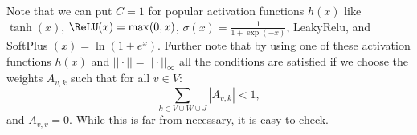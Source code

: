 \begin{Rem}
Note that we can put $C=1$ for popular activation functions $h(x)$ like $\tanh(x)$, $\ReLU(x)=\max(0,x)$, $\sigma(x)=\frac{1}{1+\exp(-x)}$, LeakyRelu, and SoftPlus $(x)=\ln(1+e^x)$.
Further note that by using one of these activation functions $h(x)$ and $||\cdot||=||\cdot||_\infty$ all the conditions are satisfied if we choose the weights $A_{v,k}$ such that for all $v \in V$:
$$\sum_{k \in V \cup W \cup J} |A_{v,k}| < 1,$$
and $A_{v,v} = 0$.
While this is far from necessary, it is easy to check.
\end{Rem}
